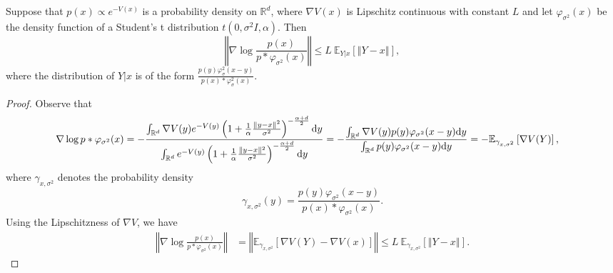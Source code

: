 \begin{lemma}\label{lemma:auxiliary_change_score_1}
    Suppose that $p(x) \propto e^{-V(x)}$ is a probability density on $\mathbb{R}^d$, where $\nabla V(x)$ is Lipschitz continuous with constant $L$ and let $\varphi_{\sigma^2}(x)$ be the density function of a Student's t distribution $t(0, \sigma^2 I, \alpha)$. 
   Then 
    \begin{equation*}
        \left\Vert \nabla \log \frac{p(x)}{p*\varphi_{\sigma^2}(x)} \right\Vert\leq  L\ \mathbb{E}_{Y|x} \left[\left \Vert Y- x\right\Vert\right],
    \end{equation*}
    where the distribution of $Y|x$ is of the form $\frac{p(y)\varphi_\sigma^2(x-y)}{p(x)*\varphi_\sigma^2(x)}$.
\end{lemma}
\begin{proof}
Observe that 
\begin{align*}
   \nabla \log p*\varphi_{\sigma^2}(x) &= -\frac{\int_{\mathbb{R}^d} \nabla V(y) e^{-V(y)}\left(1+\frac{1}{\alpha}\frac{\Vert y-x\Vert^2}{\sigma^2}\right)^{-\frac{\alpha + d}{2}} \mathrm{d} y}{\int_{\mathbb{R}^d}e^{-V(y)} \left(1+\frac{1}{\alpha}\frac{\Vert y-x\Vert^2}{\sigma^2}\right)^{-\frac{\alpha + d}{2}} \mathrm{d} y} = -\frac{\int_{\mathbb{R}^d} \nabla V(y) p(y) \varphi_{\sigma^2}(x-y) \mathrm{d} y}{\int_{\mathbb{R}^d}p(y) \varphi_{\sigma^2}(x-y) \mathrm{d} y} = -\mathbb{E}_{\gamma_{x, \sigma^2}}\left[\nabla V(Y)\right],
\end{align*}
where $\gamma_{x, \sigma^2}$ denotes the probability density
\begin{equation*}
    \gamma_{x, \sigma^2}(y)=\frac{ p(y) \varphi_{\sigma^2}(x-y)}{ p(x)* \varphi_{\sigma^2}(x)}.
\end{equation*}
Using the Lipschitzness of $\nabla V$, we have
\begin{align*}
     \left\Vert\nabla \log \frac{p(x)}{p*\varphi_{\sigma^2}(x)} \right\Vert &= \left\Vert  \mathbb{E}_{\gamma_{x, \sigma^2}}\left[\nabla V(Y)- \nabla V(x)\right]\right\Vert \leq L\ \mathbb{E}_{\gamma_{x, \sigma^2}} \left[\left \Vert Y- x\right\Vert\right].
\end{align*}
\end{proof}

